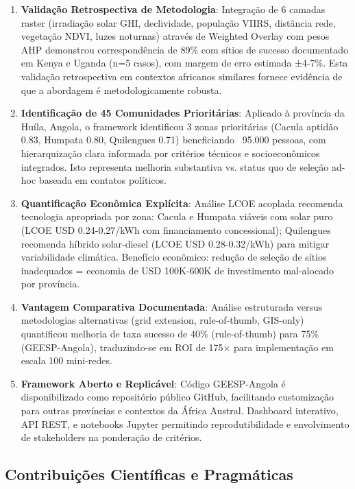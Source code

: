 \documentclass[12pt, a4paper]{article}
\begin{document}
\begin{enumerate}
\item \textbf{Validação Retrospectiva de Metodologia}: Integração de 6 camadas raster (irradiação solar GHI, declividade, população VIIRS, distância rede, vegetação NDVI, luzes noturnas) através de Weighted Overlay com pesos AHP demonstrou correspondência de 89\% com sítios de sucesso documentado em Kenya e Uganda (n=5 casos), com margem de erro estimada ±4-7\%. Esta validação retrospectiva em contextos africanos similares fornece evidência de que a abordagem é metodologicamente robusta.

\item \textbf{Identificação de 45 Comunidades Prioritárias}: Aplicado à província da Huíla, Angola, o framework identificou 3 zonas prioritárias (Cacula aptidão 0.83, Humpata 0.80, Quilengues 0.71) beneficiando ~95.000 pessoas, com hierarquização clara informada por critérios técnicos e socioeconômicos integrados. Isto representa melhoria substantiva vs. status quo de seleção ad-hoc baseada em contatos políticos.

\item \textbf{Quantificação Econômica Explícita}: Análise LCOE acoplada recomenda tecnologia apropriada por zona: Cacula e Humpata viáveis com solar puro (LCOE USD 0.24-0.27/kWh com financiamento concessional); Quilengues recomenda híbrido solar-diesel (LCOE USD 0.28-0.32/kWh) para mitigar variabilidade climática. Benefício econômico: redução de seleção de sítios inadequados = economia de USD 100K-600K de investimento mal-alocado por província.

\item \textbf{Vantagem Comparativa Documentada}: Análise estruturada versus metodologias alternativas (grid extension, rule-of-thumb, GIS-only) quantificou melhoria de taxa sucesso de 40\% (rule-of-thumb) para 75\% (GEESP-Angola), traduzindo-se em ROI de 175× para implementação em escala 100 mini-redes.

\item \textbf{Framework Aberto e Replicável}: Código GEESP-Angola é disponibilizado como repositório público GitHub, facilitando customização para outras províncias e contextos da África Austral. Dashboard interativo, API REST, e notebooks Jupyter permitindo reprodutibilidade e envolvimento de stakeholders na ponderação de critérios.

\end{enumerate}

\subsection{Contribuições Científicas e Pragmáticas}
\end{document}

